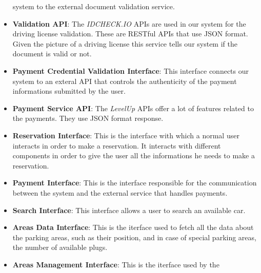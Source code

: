 \begin{itemize}
                                       system to the external document
                                       validation service.
  \item \textbf{Validation API}: The \textit{IDCHECK.IO} APIs are used in our
                                 system for the driving license validation.
                                 These are RESTful APIs that use JSON format.
                                 Given the picture of a driving license this
                                 service tells our system if the document is
                                 valid or not.
  \item \textbf{Payment Credential Validation Interface}: This interface
                                 connects our system to an exteral API that
                                 controls the authenticity of the payment
                                 informations submitted by the user.
  \item \textbf{Payment Service API}: The \textit{LevelUp} APIs offer a lot of
                                      features related to the payments. They
                                      use JSON format response.
  \item \textbf{Reservation Interface}: This is the interface with which a
                                        normal user interacts in order to make a
                                        reservation. It interacts with different
                                        components in order to give the user all
                                        the informations he needs to make a
                                        reservation.
  \item \textbf{Payment Interface}: This is the interface responsible for the
                                    communication between the system and the
                                    external service that handles payments.
  \item \textbf{Search Interface}: This interface allows a user to search an
                                   available car.
  \item \textbf{Areas Data Interface}: This is the iterface used to fetch all
                                       the data about the parking areas, such as
                                       their position, and in case of special
                                       parking areas, the number of available
                                       plugs.
  \item \textbf{Areas Management Interface}: This is the iterface used by the

\end{itemize}
